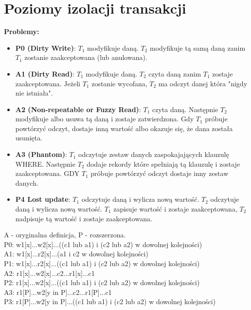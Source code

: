 \documentclass[a4paper]{article}
\begin{document}
\section{Poziomy izolacji transakcji}
\textbf{Problemy:}
\begin{itemize}
    \item \textbf{P0 (Dirty Write)}: $T_1$ modyfikuje daną. $T_2$ modyfikuje tą samą daną zanim $T_1$ zostanie zaakceptowana (lub anulowana).
    \item \textbf{A1 (Dirty Read)}: $T_1$ modyfikuje daną. $T_2$ czyta daną zanim $T_1$ zostaje zaakceptowana. Jeżeli $T_1$ zostanie wycofana, $T_2$ ma odczyt danej która "nigdy nie istniała".
    \item \textbf{A2 (Non-repeatable or Fuzzy Read)}: $T_1$ czyta daną. Następnie $T_2$ modyfikuje albo usuwa tą daną i zostaje zatwierdzona. Gdy $T_1$ próbuje powtórzyć odczyt, dostaje inną wartość albo okazuje się, że dana została usunięta.
    \item \textbf{A3 (Phantom)}: $T_1$ odczytuje zestaw danych zaspokajających klauzulę WHERE. Następnie $T_2$ dodaje rekordy które spełniają tą klauzulę i zostaje zaakceptowana. GDY $T_1$ próbuje powtórzyć odczyt dostaje inny zestaw danych.
    \item \textbf{P4 Lost update}: $T_1$ odczytuje daną i wylicza nową wartość. $T_2$ odczytuje daną i wylicza nową wartość. $T_1$ zapisuje wartość i zostaje zaakceptowana, $T_2$ nadpisuje tą wartość i zostaje zaakceptowana.
\end{itemize}

A - oryginalna definicja, P - rozszerzona.\\

P0: w1[x]...w2[x]...((c1 lub a1) i (c2 lub a2) w dowolnej kolejności)\\

A1: w1[x]...r2[x]...(a1 i c2 w dowolnej kolejności)\\
P1: w1[x]...r2[x]...((c1 lub a1) i (c2 lub a2) w dowolnej kolejności)\\

A2: r1[x]...w2[x]...c2...r1[x]...c1\\
P2: r1[x]...w2[x]...((c1 lub a1) i (c2 lub a2) w dowolnej kolejności)\\

A3: r1[P]...w2[y in P]...c2...r1[P]...c1\\
P3: r1[P]...w2[y in P]...((c1 lub a1) i (c2 lub a2) w dowolnej kolejności)\\
\end{document}
